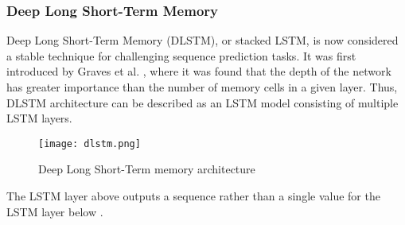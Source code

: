 \subsubsection{Deep Long Short-Term Memory}

Deep Long Short-Term Memory (DLSTM), or stacked LSTM, is now considered a stable technique for challenging sequence prediction tasks. It was first introduced by Graves et al. \cite{gravesDLSTM}, where it was found that the depth of the network has greater importance than the number of memory cells in a given layer. Thus, DLSTM architecture can be described as an LSTM model consisting of multiple LSTM layers.

\begin{figure}[H]
    \centering
    \texttt{[image: dlstm.png]}
    \caption{Deep Long Short-Term memory architecture \cite{brownleeDLSTM}}
    \label{fig:dlstm}
\end{figure}

The LSTM layer above outputs a sequence rather than a single value for the LSTM layer below \cite{brownleeDLSTM}.

